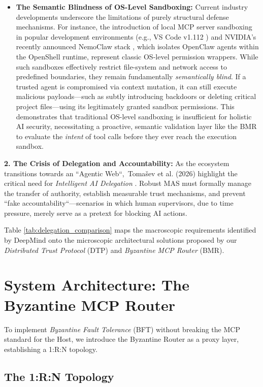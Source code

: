 \documentclass[a4paper,11pt,twocolumn]{article}
\theoremstyle{definition}
\theoremstyle{plain}
\begin{document}
\begin{itemize}
    \item \textbf{The Semantic Blindness of OS-Level Sandboxing:} Current industry developments underscore the limitations of purely structural defense mechanisms. For instance, the introduction of local MCP server sandboxing in popular development environments (e.g., VS Code v1.112 \cite{vscode2026mcp}) and NVIDIA's recently announced NemoClaw stack \cite{nemoclaw2026}, which isolates OpenClaw agents within the OpenShell runtime, represent classic OS-level permission wrappers. While such sandboxes effectively restrict file-system and network access to predefined boundaries, they remain fundamentally \textit{semantically blind}. If a trusted agent is compromised via context mutation, it can still execute malicious payloads---such as subtly introducing backdoors or deleting critical project files---using its legitimately granted sandbox permissions. This demonstrates that traditional OS-level sandboxing is insufficient for holistic AI security, necessitating a proactive, semantic validation layer like the BMR to evaluate the \textit{intent} of tool calls before they ever reach the execution sandbox.

\end{itemize}

\textbf{2. The Crisis of Delegation and Accountability:}
As the ecosystem transitions towards an “Agentic Web“,\ Toma{\v{s}}ev et al. (2026) highlight the critical need for \textit{Intelligent AI Delegation} \cite{tomasev2026intelligent}.
Robust MAS must formally manage the transfer of authority, establish measurable trust mechanisms, and prevent “fake accountability“---scenarios in which human supervisors, due to time pressure, merely serve as a pretext for blocking AI actions.

Table \ref{tab:delegation_comparison} maps the macroscopic requirements identified by DeepMind onto the microscopic architectural solutions proposed by our \textit{Distributed Trust Protocol} (DTP) and \textit{Byzantine MCP Router} (BMR).

\section{System Architecture: The Byzantine MCP Router}

To implement \textit{Byzantine Fault Tolerance} (BFT) without breaking the MCP standard for the Host, we introduce the Byzantine Router as a proxy layer, establishing a 1:R:N topology.

\subsection{The 1:R:N Topology}
\end{document}

